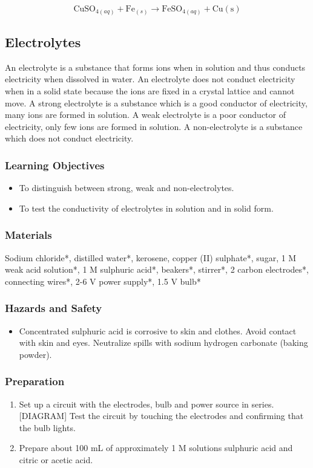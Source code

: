 $$ \mathrm{CuSO}_{4(aq)} + \mathrm{Fe}_{(s)} \longrightarrow \mathrm{FeSO}_{4(aq)} + \mathrm{Cu(s)} $$

\subsection{Electrolytes}

An electrolyte is a substance that forms ions when in solution and thus conducts electricity when dissolved in water. An electrolyte does not conduct electricity when in a solid state because the ions are fixed in a crystal lattice and cannot move.  A strong electrolyte is a substance which is a good conductor of electricity, many ions are formed in solution. A weak electrolyte is a poor conductor of electricity, only few ions are formed in solution. A non-electrolyte is a substance which does not conduct electricity.

\subsubsection*{Learning Objectives}
\begin{itemize}
\item{To distinguish between strong, weak and non-electrolytes.}
\item{To test the conductivity of electrolytes in solution and in solid form.}
\end{itemize}

\subsubsection*{Materials}
Sodium chloride*, distilled water*, kerosene, copper (II) sulphate*, sugar, 1 M weak acid solution*, 1 M sulphuric acid*, beakers*, stirrer*, 2 carbon electrodes*, connecting wires*, 2-6 V power supply*, 1.5 V bulb*

\subsubsection*{Hazards and Safety}
\begin{itemize}
\item{Concentrated sulphuric acid is corrosive to skin and clothes. Avoid contact with skin and eyes. Neutralize spills with sodium hydrogen carbonate (baking powder).}
\end{itemize}

\subsubsection*{Preparation}
\begin{enumerate}
\item{Set up a circuit with the electrodes, bulb and power source in series. [DIAGRAM] Test the circuit by touching the electrodes and confirming that the bulb lights.}
\item{Prepare about 100 mL of approximately 1 M solutions sulphuric acid and citric or acetic acid.}
\end{enumerate}

